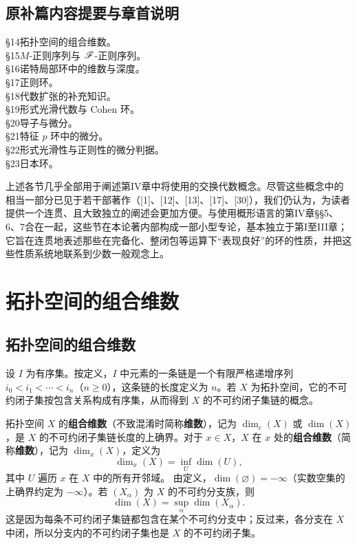 \subsection*{原补篇内容提要与章首说明}
\noindent §14\quad 拓扑空间的组合维数。\\
§15\quad $M$-正则序列与 $\mathscr F$-正则序列。\\
§16\quad 诺特局部环中的维数与深度。\\
§17\quad 正则环。\\
§18\quad 代数扩张的补充知识。\\
§19\quad 形式光滑代数与 Cohen 环。\\
§20\quad 导子与微分。\\
§21\quad 特征 $p$ 环中的微分。\\
§22\quad 形式光滑性与正则性的微分判据。\\
§23\quad 日本环。

上述各节几乎全部用于阐述第IV章中将使用的交换代数概念。尽管这些概念中的相当一部分已见于若干部著作（[1]、[12]、[13]、[17]、[30]），我们仍认为，为读者提供一个连贯、且大致独立的阐述会更加方便。与使用概形语言的第IV章§§5、6、7合在一起，这些节在本论著内部构成一部小型专论，基本独立于第I至III章；它旨在连贯地表述那些在完备化、整闭包等运算下“表现良好”的环的性质，并把这些性质系统地联系到少数一般观念上。

\setcounter{section}{13}\section{拓扑空间的组合维数}
\subsection{拓扑空间的组合维数}
设 $I$ 为有序集。按定义，$I$ 中元素的一条链是一个有限严格递增序列
$i_0<i_1<\cdots<i_n$（$n\geq0$），这条链的长度定义为 $n$。若 $X$ 为拓扑空间，它的不可约闭子集按包含关系构成有序集，从而得到 $X$ 的不可约闭子集链的概念。

拓扑空间 $X$ 的\textbf{组合维数}（不致混淆时简称\textbf{维数}），记为 $\dim_c(X)$ 或 $\dim(X)$，是 $X$ 的不可约闭子集链长度的上确界。对于 $x\in X$，$X$ 在 $x$ 处的\textbf{组合维数}（简称\textbf{维数}），记为 $\dim_x(X)$，定义为
\[
 \dim_x(X)=\inf_U\dim(U),
\]
其中 $U$ 遍历 $x$ 在 $X$ 中的所有开邻域。
由定义，$\dim(\varnothing)=-\infty$（实数空集的上确界约定为 $-\infty$）。若 $(X_\alpha)$ 为 $X$ 的不可约分支族，则
\begin{equation}
 \dim(X)=\sup_\alpha\dim(X_\alpha).\tag{14.1.2.1}
\end{equation}
这是因为每条不可约闭子集链都包含在某个不可约分支中；反过来，各分支在 $X$ 中闭，所以分支内的不可约闭子集也是 $X$ 的不可约闭子集。

